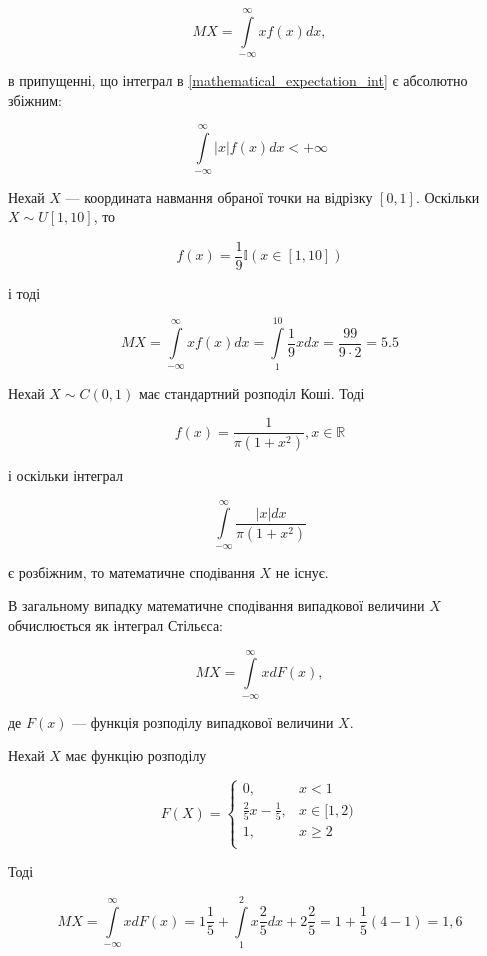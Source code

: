 \begin{equation}
    \label{mathematical_expectation_int}
    MX = \int\limits_{-\infty}^{\infty} x f(x) dx,
\end{equation}

в припущенні, що інтеграл в \ref{mathematical_expectation_int}
є абсолютно збіжним:

\begin{equation}
    \int\limits_{-\infty}^{\infty} |x| f(x) dx < + \infty
\end{equation}


\begin{example}
    Нехай $X$ --- координата навмання обраної точки
    на відрізку $[0, 1]$.
    Оскільки $X \sim U[1, 10]$, то 

    $$f(x) = \frac{1}{9} \mathbb{I}(x \in [1, 10])$$
    
    і тоді

    $$MX = \int\limits_{-\infty}^{\infty} x f(x) dx
    = \int\limits_{1}^{10} \frac{1}{9} x dx
    = \frac{99}{9 \cdot 2}
    = 5.5$$
\end{example}

\begin{example}
    Нехай $X \sim C(0, 1)$ має стандартний розподіл Коші.
    Тоді

    $$f(x) = \frac{1}{\pi(1 + x^2)}, x \in \mathbb{R}$$
    
    і оскільки інтеграл 
    
    $$\int\limits_{-\infty}^{\infty} \frac{|x| dx}{\pi (1+x^2)}$$
    
    є розбіжним, то математичне
    сподівання $X$ не існує.
\end{example}

\begin{remark}
    В загальному випадку математичне сподівання
    випадкової величини $X$ обчислюється як
    інтеграл Стільєса:

    \begin{equation}
        MX = \int\limits_{-\infty}^{\infty} x dF(x),
    \end{equation}

    де $F(x)$ --- функція розподілу випадкової величини $X$.
\end{remark}

\begin{example}
    Нехай $X$ має функцію розподілу
    
    $$F(X) = \left\{ \begin{array}{ll}
        0, & x < 1 \\
        \frac{2}{5}x - \frac{1}{5}, & x \in [1, 2) \\
        1, & x \geqslant 2 \\
    \end{array} \right.$$
    
    \beautifulImage
    
    Тоді
    
    $$MX
    = \int\limits_{-\infty}^{\infty} x dF(x)
    = 1 \frac{1}{5} + \int\limits_{1}^{2} x \frac{2}{5} dx + 2 \frac{2}{5}
    = 1 + \frac{1}{5}(4-1)
    = 1,6$$
\end{example}

